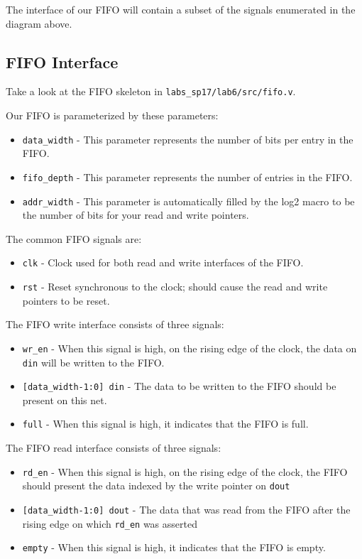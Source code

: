 \documentclass[11pt]{article}
\begin{document}
The interface of our FIFO will contain a subset of the signals enumerated in the diagram above.

\subsection{FIFO Interface}
Take a look at the FIFO skeleton in \verb|labs_sp17/lab6/src/fifo.v|.

Our FIFO is parameterized by these parameters:
\begin{itemize}
	\item \verb|data_width| - This parameter represents the number of bits per entry in the FIFO.
	\item \verb|fifo_depth| - This parameter represents the number of entries in the FIFO.
	\item \verb|addr_width| - This parameter is automatically filled by the log2 macro to be the number of bits for your read and write pointers.
\end{itemize}

The common FIFO signals are:
\begin{itemize}
	\item \verb|clk| - Clock used for both read and write interfaces of the FIFO.
	\item \verb|rst| - Reset synchronous to the clock; should cause the read and write pointers to be reset.
\end{itemize}

The FIFO write interface consists of three signals:
\begin{itemize}
	\item \verb|wr_en| - When this signal is high, on the rising edge of the clock, the data on \verb|din| will be written to the FIFO.
	\item \verb|[data_width-1:0] din| - The data to be written to the FIFO should be present on this net.
	\item \verb|full| - When this signal is high, it indicates that the FIFO is full.
\end{itemize}

The FIFO read interface consists of three signals:
\begin{itemize}
	\item \verb|rd_en| - When this signal is high, on the rising edge of the clock, the FIFO should present the data indexed by the write pointer on \verb|dout|
	\item \verb|[data_width-1:0] dout| - The data that was read from the FIFO after the rising edge on which \verb|rd_en| was asserted
	\item \verb|empty| - When this signal is high, it indicates that the FIFO is empty.
\end{itemize}
\end{document}

